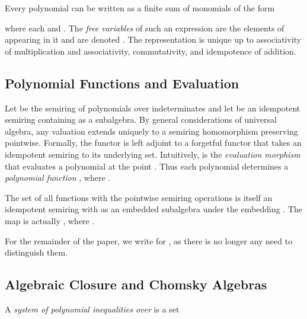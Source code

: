 \documentclass[copyright,creativecommons]{eptcs}
\theoremstyle{remark}
\newcommand{\fhcomment}[1]{\textcolor{red}{[\textbf{Comment (FH)}: {#1}]}}
\newcommand{\dkcomment}[1]{\textcolor{blue}{[\textbf{Comment (DK)}: {#1}]}}
\renewcommand{\fhcomment}[1]{}
\renewcommand{\dkcomment}[1]{}
\begin{document}
Every polynomial can be written as a finite sum of monomials of the form

where each  and . The \emph{free variables} of such an expression  are the elements of  appearing in it and are denoted . The representation is unique up to associativity of multiplication and associativity, commutativity, and idempotence of addition.

\fhcomment{Problem: ``Free variables'' not well-defined for .
Proposal: Change from  to introduction of polynomial expressions 
, 
interpretation over polynomial expressions, analogous to  of
Section 2.4.  We introduce ``free'' -expressions in this version of the paper and the domain of  need not be a semiring anyway; gives simpler presentation since  not required, only expressions  and their extension  in Section 2.4.}\dkcomment{Actually, I believe it is well defined if you write the polynomial as a sum of monomials as I have described.}\fhcomment{I see, thanks. Should we add that every polynomial can be written \emph{uniquely} as a sum over a set of monomials?}

\subsection{Polynomial Functions and Evaluation}

Let  be the semiring of polynomials over indeterminates  and let  be an idempotent semiring containing  as a subalgebra.
By general considerations of universal algebra, any valuation  extends uniquely to a semiring homomorphism  preserving  pointwise.
Formally, the functor  is left adjoint to a forgetful functor that takes an idempotent semiring  to its underlying set.
Intuitively,  is the \emph{evaluation morphism} that evaluates a polynomial at the point .
Thus each polynomial  determines a \emph{polynomial function} , where .

The set of all functions  with the pointwise semiring operations is itself an idempotent semiring with  as an embedded subalgebra under the embedding . The map  is actually , where  .

For the remainder of the paper, we write  for , as there is no longer any need to distinguish them.

\subsection{Algebraic Closure and Chomsky Algebras}
\label{sec:Chomsky}

A \emph{system of polynomial inequalities over } is a set
\end{document}
